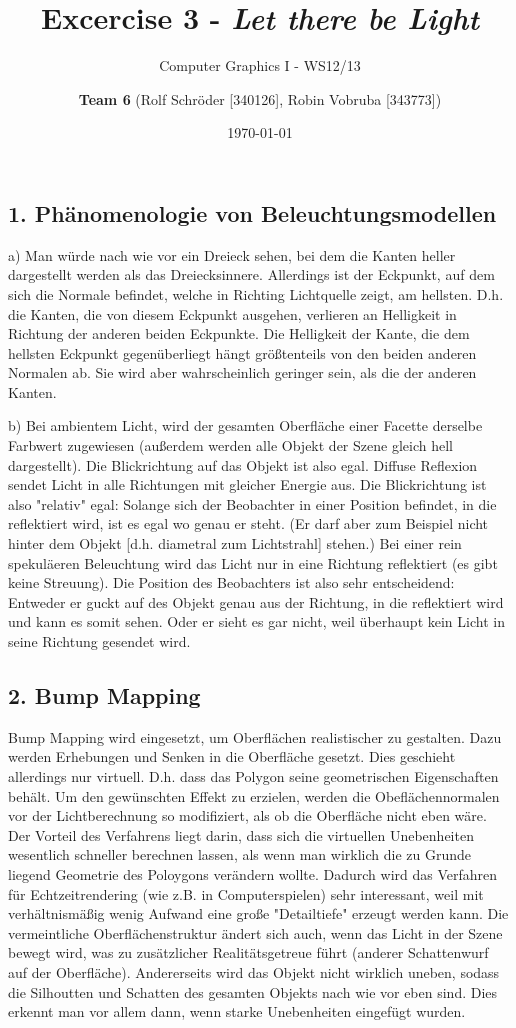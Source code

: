 \documentclass[a4paper,headings=small]{scrartcl}
\title{Excercise 3 - \emph{Let there be Light}}
\subtitle{Computer Graphics I - WS12/13}
\author{\textbf{Team 6} (Rolf Schröder [340126], Robin Vobruba [343773])}
\date{\today}
\numberwithin{equation}{section} %
\numberwithin{figure}{section}   %
\begin{document}
\maketitle


\subsection*{1. Phänomenologie von Beleuchtungsmodellen}
a) Man würde nach wie vor ein Dreieck sehen, bei dem die Kanten heller dargestellt werden als das Dreiecksinnere.
Allerdings ist der Eckpunkt, auf dem sich die Normale befindet, welche in Richting Lichtquelle zeigt, am hellsten.
D.h. die Kanten, die von diesem Eckpunkt ausgehen, verlieren an Helligkeit in Richtung der anderen beiden Eckpunkte.
Die Helligkeit der Kante, die dem hellsten Eckpunkt gegenüberliegt hängt größtenteils von den beiden anderen Normalen ab.
Sie wird aber wahrscheinlich geringer sein, als die der anderen Kanten.

b) Bei ambientem Licht, wird der gesamten Oberfläche einer Facette derselbe Farbwert zugewiesen (außerdem werden alle Objekt der Szene gleich hell dargestellt).
Die Blickrichtung auf das Objekt ist also egal.
Diffuse Reflexion sendet Licht in alle Richtungen mit gleicher Energie aus.
Die Blickrichtung ist also "relativ" egal:
Solange sich der Beobachter in einer Position befindet, in die reflektiert wird, ist es egal wo genau er steht.
(Er darf aber zum Beispiel nicht hinter dem Objekt [d.h. diametral zum Lichtstrahl] stehen.)
Bei einer rein spekuläeren Beleuchtung wird das Licht nur in eine Richtung reflektiert (es gibt keine Streuung).
Die Position des Beobachters ist also sehr entscheidend:
Entweder er guckt auf des Objekt genau aus der Richtung, in die reflektiert wird und kann es somit sehen.
Oder er sieht es gar nicht, weil überhaupt kein Licht in seine Richtung gesendet wird.

\subsection*{2. Bump Mapping}
Bump Mapping wird eingesetzt, um Oberflächen realistischer zu gestalten.
Dazu werden Erhebungen und Senken in die Oberfläche gesetzt.
Dies geschieht allerdings nur virtuell.
D.h. dass das Polygon seine geometrischen Eigenschaften behält.
Um den gewünschten Effekt zu erzielen, werden die Obeflächennormalen vor der Lichtberechnung so modifiziert, als ob die Oberfläche nicht eben wäre.
Der Vorteil des Verfahrens liegt darin, dass sich die virtuellen Unebenheiten wesentlich schneller berechnen lassen, als wenn man wirklich die zu Grunde liegend Geometrie des Poloygons verändern wollte. Dadurch wird das Verfahren für Echtzeitrendering (wie z.B. in Computerspielen) sehr interessant, weil mit verhältnismäßig wenig Aufwand eine große "Detailtiefe" erzeugt werden kann. Die vermeintliche Oberflächenstruktur ändert sich auch, wenn das Licht in der Szene bewegt wird, was zu zusätzlicher Realitätsgetreue führt (anderer Schattenwurf auf der Oberfläche).
Andererseits wird das Objekt nicht wirklich uneben, sodass die Silhoutten und Schatten des gesamten Objekts nach wie vor eben sind. Dies erkennt man vor allem dann, wenn starke Unebenheiten eingefügt wurden.
\end{document}
